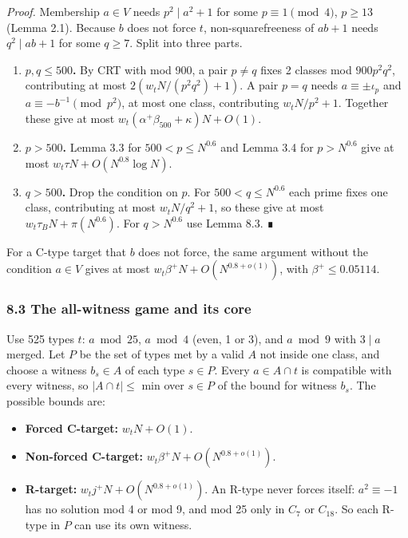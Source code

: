 \documentclass[
  11pt,
]{article}
\providecommand{\tightlist}{%
  \setlength{\itemsep}{0pt}\setlength{\parskip}{0pt}}
\begin{document}
\emph{Proof.} Membership \(a \in V\) needs \(p^2 \mid a^2 + 1\) for some
\(p \equiv 1 \pmod{4}\), \(p \ge 13\) (Lemma 2.1). Because \(b\) does
not force \(t\), non-squarefreeness of \(ab + 1\) needs
\(q^2 \mid ab + 1\) for some \(q \ge 7\). Split into three parts.

\begin{enumerate}
\def\labelenumi{\arabic{enumi}.}
\tightlist
\item
  \textbf{\(p, q \le 500\).} By CRT with mod 900, a pair \(p \ne q\)
  fixes 2 classes mod \(900p^2q^2\), contributing at most
  \(2(w_t N/(p^2q^2) + 1)\). A pair \(p = q\) needs
  \(a \equiv \pm\iota_p\) and \(a \equiv -b^{-1} \pmod{p^2}\), at most
  one class, contributing \(w_t N/p^2 + 1\). Together these give at most
  \(w_t(\alpha^{+}\beta_{500} + \kappa)N + O(1)\).
\item
  \textbf{\(p > 500\).} Lemma 3.3 for \(500 < p \le N^{0.6}\) and Lemma
  3.4 for \(p > N^{0.6}\) give at most
  \(w_t \tau N + O(N^{0.8} \log N)\).
\item
  \textbf{\(q > 500\).} Drop the condition on \(p\). For
  \(500 < q \le N^{0.6}\) each prime fixes one class, contributing at
  most \(w_t N/q^2 + 1\), so these give at most
  \(w_t \tau_B N + \pi(N^{0.6})\). For \(q > N^{0.6}\) use Lemma 8.3. ∎
\end{enumerate}

For a C-type target that \(b\) does not force, the same argument without
the condition \(a \in V\) gives at most
\(w_t \beta^{+} N + O(N^{0.8+o(1)})\), with \(\beta^{+} \le 0.05114\).

\subsubsection{8.3 The all-witness game and its core}

Use 525 types \(t\): \(a \bmod 25\), \(a \bmod 4\) (even, 1 or 3), and
\(a \bmod 9\) with \(3 \mid a\) merged. Let \(P\) be the set of types
met by a valid \(A\) not inside one class, and choose a witness
\(b_s \in A\) of each type \(s \in P\). Every \(a \in A \cap t\) is
compatible with every witness, so \(|A \cap t| \le\) min over
\(s \in P\) of the bound for witness \(b_s\). The possible bounds are:

\begin{itemize}
\tightlist
\item
  \textbf{Forced C-target:} \(w_t N + O(1)\).
\item
  \textbf{Non-forced C-target:} \(w_t \beta^{+} N + O(N^{0.8+o(1)})\).
\item
  \textbf{R-target:} \(w_t j^{+} N + O(N^{0.8+o(1)})\). An R-type never
  forces itself: \(a^2 \equiv -1\) has no solution mod 4 or mod 9, and
  mod 25 only in \(C_7\) or \(C_{18}\). So each R-type in \(P\) can use
  its own witness.
\end{itemize}
\end{document}
